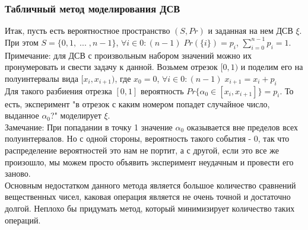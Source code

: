 \subsubsection{Табличный метод моделирования ДСВ}
Итак, пусть есть вероятностное пространство $(S, Pr)$ и заданная на нем ДСВ $\xi$.\\
При этом $S = \{0, 1, \; ... \; , n - 1\}$, $\forall i \in 0:(n - 1) \; Pr(\{i\}) = p_i$, $\sum\limits_{i = 0}^{n - 1} p_i = 1$.\\
Примечание: для ДСВ с произвольным набором значений можно их пронумеровать и свести задачу к данной.
Возьмем отрезок $[0, 1)$ и поделим его на полуинтервалы вида $[x_i, x_{i + 1})$, где $x_0 = 0$, $\forall i \in 0:(n - 1) \; x_{i + 1} = x_i + p_i$\\
Для такого разбиения отрезка $[0, 1]$ вероятность $Pr\{\alpha_0 \in [x_i, x_{i + 1}]\} = p_i$. То есть, эксперимент "в отрезок с каким номером попадет случайное число, выданное $\alpha_0$?" моделирует $\xi$.\\
Замечание: При попадании в точку 1 значение $\alpha_0$ оказывается вне пределов всех полуинтервалов. Но с одной стороны, вероятность такого события - 0, так что распределение вероятностей это нам не портит, а с другой, если это все же произошло, мы можем просто объявить эксперимент неудачным и провести его заново.\\
Основным недостатком данного метода является большое количество сравнений вещественных чисел, каковая операция является не очень точной и достаточно долгой. Неплохо бы придумать метод, который минимизирует количество таких операций.
